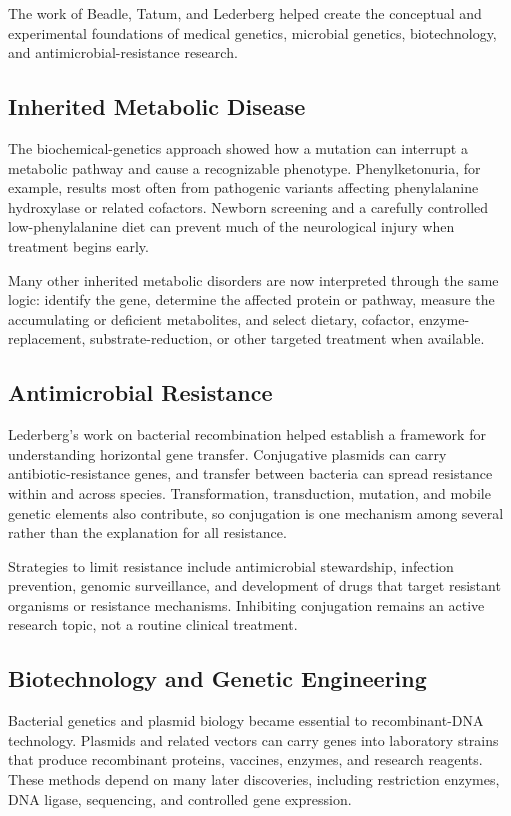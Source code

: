 The work of Beadle, Tatum, and Lederberg helped create the conceptual and experimental foundations of medical genetics, microbial genetics, biotechnology, and antimicrobial-resistance research.

\subsection{Inherited Metabolic Disease}

The biochemical-genetics approach showed how a mutation can interrupt a metabolic pathway and cause a recognizable phenotype. Phenylketonuria, for example, results most often from pathogenic variants affecting phenylalanine hydroxylase or related cofactors. Newborn screening and a carefully controlled low-phenylalanine diet can prevent much of the neurological injury when treatment begins early.

Many other inherited metabolic disorders are now interpreted through the same logic: identify the gene, determine the affected protein or pathway, measure the accumulating or deficient metabolites, and select dietary, cofactor, enzyme-replacement, substrate-reduction, or other targeted treatment when available.

\subsection{Antimicrobial Resistance}

Lederberg's work on bacterial recombination helped establish a framework for understanding horizontal gene transfer. Conjugative plasmids can carry antibiotic-resistance genes, and transfer between bacteria can spread resistance within and across species. Transformation, transduction, mutation, and mobile genetic elements also contribute, so conjugation is one mechanism among several rather than the explanation for all resistance.

Strategies to limit resistance include antimicrobial stewardship, infection prevention, genomic surveillance, and development of drugs that target resistant organisms or resistance mechanisms. Inhibiting conjugation remains an active research topic, not a routine clinical treatment.

\subsection{Biotechnology and Genetic Engineering}

Bacterial genetics and plasmid biology became essential to recombinant-DNA technology. Plasmids and related vectors can carry genes into laboratory strains that produce recombinant proteins, vaccines, enzymes, and research reagents. These methods depend on many later discoveries, including restriction enzymes, DNA ligase, sequencing, and controlled gene expression.

